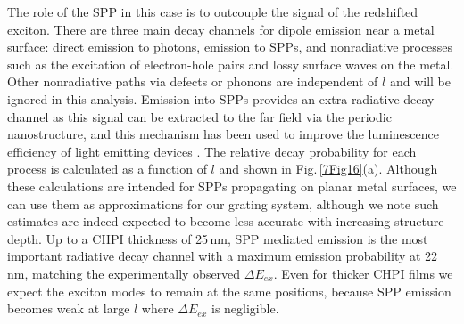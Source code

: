 The role of the SPP in this case is to outcouple the signal of the redshifted exciton. There are three main decay channels for dipole emission near a metal surface: direct emission to photons, emission to SPPs, and nonradiative processes such as the excitation of electron-hole pairs and lossy surface waves on the metal. Other nonradiative paths via defects or phonons are independent of $l$ and will be ignored in this analysis. Emission into SPPs provides an extra radiative decay channel as this signal can be extracted to the far field via the periodic nanostructure, and this mechanism has been used to improve the luminescence efficiency of light emitting devices \cite{Frischeisen2011, Kumar2012}. The relative decay probability for each process is calculated as a function of $l$ \cite{Ford1984} and shown in Fig.\,\ref{7Fig16}(a). Although these calculations are intended for SPPs propagating on planar metal surfaces, we can use them as approximations for our grating system, although we note such estimates are indeed expected to become less accurate with increasing structure depth. Up to a CHPI thickness of 25\,nm, SPP mediated emission is the most important radiative decay channel with a maximum emission probability at 22\,nm, matching the experimentally observed $\Delta E_{ex}$. Even for thicker CHPI films we expect the exciton modes to remain at the same positions, because SPP emission becomes weak at large $l$ where $\Delta E_{ex}$ is negligible.


